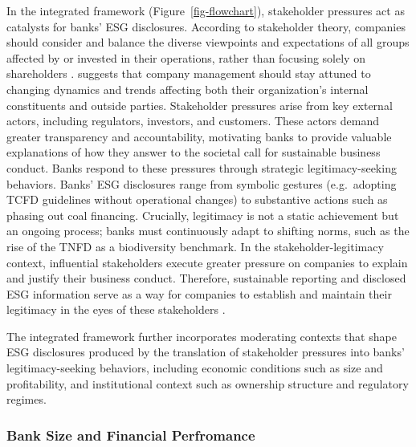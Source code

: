 \documentclass[
  authoryear]{elsarticle}
\begin{document}
In the integrated framework (Figure~\ref{fig-flowchart}), stakeholder
pressures act as catalysts for banks' ESG disclosures. According to
stakeholder theory, companies should consider and balance the diverse
viewpoints and expectations of all groups affected by or invested in
their operations, rather than focusing solely on shareholders
\citep{BUCHHOLZ2005, LAPLUME2008}. \citet{FREEMAN1984} suggests that
company management should stay attuned to changing dynamics and trends
affecting both their organization's internal constituents and outside
parties. Stakeholder pressures arise from key external actors, including
regulators, investors, and customers. These actors demand greater
transparency and accountability, motivating banks to provide valuable
explanations of how they answer to the societal call for sustainable
business conduct. Banks respond to these pressures through strategic
legitimacy-seeking behaviors. Banks' ESG disclosures range from symbolic
gestures (e.g.~adopting TCFD guidelines without operational changes) to
substantive actions such as phasing out coal financing. Crucially,
legitimacy is not a static achievement but an ongoing process; banks
must continuously adapt to shifting norms, such as the rise of the TNFD
as a biodiversity benchmark. In the stakeholder-legitimacy context,
influential stakeholders execute greater pressure on companies to
explain and justify their business conduct. Therefore, sustainable
reporting and disclosed ESG information serve as a way for companies to
establish and maintain their legitimacy in the eyes of these
stakeholders \citep{CAMPBELL_D2003}.

The integrated framework further incorporates moderating contexts that
shape ESG disclosures produced by the translation of stakeholder
pressures into banks' legitimacy-seeking behaviors, including economic
conditions such as size and profitability, and institutional context
such as ownership structure and regulatory regimes.

\subsubsection{Bank Size and Financial
Perfromance}\label{bank-size-and-financial-perfromance}
\end{document}
